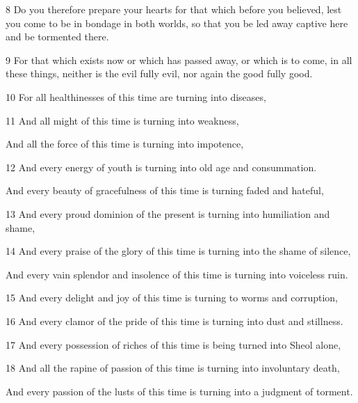 \par 8 Do you therefore prepare your hearts for that which before you believed, lest you come to be in bondage in both worlds, so that you be led away captive here and be tormented there. 

\par 9 For that which exists now or which has passed away, or which is to come, in all these things, neither is the evil fully evil, nor again the good fully good.

\par 10 For all healthinesses of this time are turning into diseases,

\par 11 And all might of this time is turning into weakness,

\par And all the force of this time is turning into impotence,

\par 12 And every energy of youth is turning into old age and consummation.

\par And every beauty of gracefulness of this time is turning faded and hateful,

\par 13 And every proud dominion of the present is turning into humiliation and shame,

\par 14 And every praise of the glory of this time is turning into the shame of silence,

\par And every vain splendor and insolence of this time is turning into voiceless ruin.

\par 15 And every delight and joy of this time is turning to worms and corruption,

\par 16 And every clamor of the pride of this time is turning into dust and stillness.

\par 17 And every possession of riches of this time is being turned into Sheol alone,

\par 18 And all the rapine of passion of this time is turning into involuntary death,

\par And every passion of the lusts of this time is turning into a judgment of torment.

